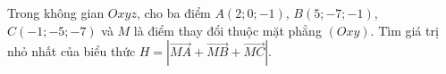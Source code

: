 \begin{ex}
Trong không gian $Oxyz$, cho ba điểm $A(2;0;-1)$, $B(5;-7;-1)$, $C(-1;-5;-7)$ và $M$ là điểm thay đổi thuộc mặt phẳng $(Oxy)$. Tìm giá trị nhỏ nhất của biểu thức $H=\left|\overrightarrow{MA}+\overrightarrow{MB}+\overrightarrow{MC}\right|$.
\end{ex}
